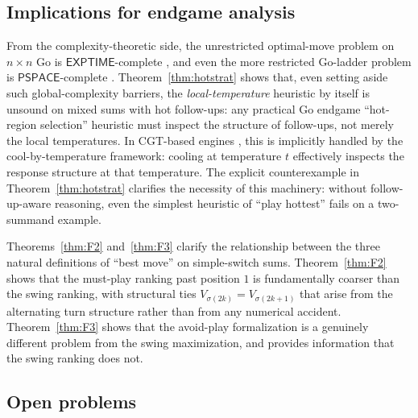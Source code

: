 \documentclass[11pt,a4paper]{amsart}
\theoremstyle{definition}
\theoremstyle{remark}
\newcommand{\PSPACE}{\mathsf{PSPACE}}
\begin{document}
\subsection{Implications for endgame analysis}

From the complexity-theoretic side, the unrestricted optimal-move
problem on $n \times n$ Go is $\mathsf{EXPTIME}$-complete
\cite{Robson1983}, and even the more restricted Go-ladder problem is
$\PSPACE$-complete \cite{CrasmaruTromp2000}. Theorem~\ref{thm:hotstrat}
shows that, even setting aside such global-complexity barriers, the
\emph{local-temperature} heuristic by itself is unsound on mixed sums
with hot follow-ups: any practical Go endgame ``hot-region selection''
heuristic must inspect the structure of follow-ups, not merely the local
temperatures. In CGT-based engines
\cite{BW1994,Spight2002}, this is implicitly handled by the
cool-by-temperature framework: cooling at temperature $t$ effectively
inspects the response structure at that temperature. The explicit
counterexample in Theorem~\ref{thm:hotstrat} clarifies the necessity of
this machinery: without follow-up-aware reasoning, even the simplest
heuristic of ``play hottest'' fails on a two-summand example.

Theorems~\ref{thm:F2} and~\ref{thm:F3} clarify the relationship between
the three natural definitions of ``best move'' on simple-switch sums.
Theorem~\ref{thm:F2} shows that the must-play ranking past position $1$
is fundamentally coarser than the swing ranking, with structural ties
$V_{\sigma(2k)} = V_{\sigma(2k+1)}$ that arise from the alternating
turn structure rather than from any numerical accident. Theorem~\ref{thm:F3}
shows that the avoid-play formalization is a genuinely different problem
from the swing maximization, and provides information that the swing
ranking does not.

\subsection{Open problems}
\end{document}
